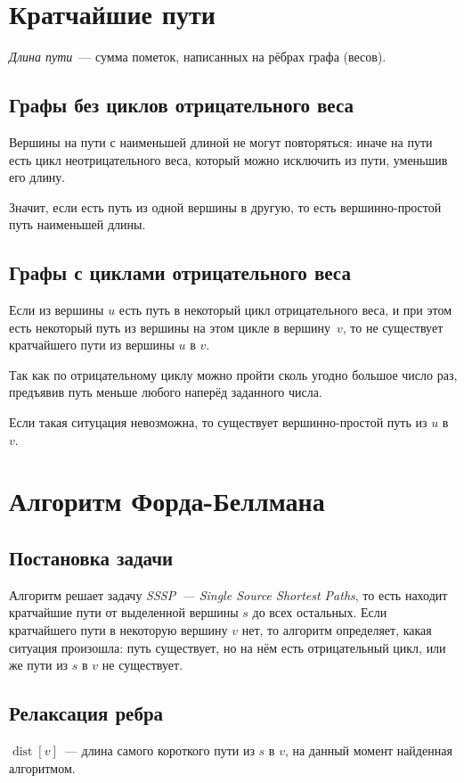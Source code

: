 \documentclass[a4paper,12pt]{article}
\DeclareMathOperator{\dist}{dist}
\begin{document}
  \section{Кратчайшие пути}

  \emph{Длина пути}~--- сумма пометок, написанных на рёбрах графа (весов).

    \subsection{Графы без циклов отрицательного веса}
    Вершины на пути с наименьшей длиной не могут повторяться:
    иначе на пути есть цикл неотрицательного веса, который можно исключить из пути,
    уменьшив его длину.

    Значит, если есть путь из одной вершины в другую, то есть вершинно-простой путь
    наименьшей длины.

    \subsection{Графы с циклами отрицательного веса}
    Если из вершины $u$ есть путь в некоторый цикл отрицательного веса,
    и при этом есть некоторый путь из вершины на этом цикле в вершину~$v$,
    то не существует кратчайшего пути из вершины $u$ в $v$.

    Так как по отрицательному циклу можно пройти сколь угодно большое число раз,
    предъявив путь меньше любого наперёд заданного числа.

    Если такая ситуцация невозможна, то существует вершинно-простой путь из $u$ в $v$.

  \section{Алгоритм Форда-Беллмана}

    \subsection{Постановка задачи}
    Алгоритм решает задачу \emph{SSSP~--- Single Source Shortest Paths},
    то есть находит кратчайшие пути от выделенной вершины $s$ до всех остальных.
    Если кратчайшего пути в некоторую вершину $v$ нет, то алгоритм определяет,
    какая ситуация произошла: путь существует, но на нём есть отрицательный цикл,
    или же пути из $s$ в $v$ не существует.

    \subsection{Релаксация ребра}
    $\dist[v]$~--- длина самого короткого пути из $s$ в $v$,
    на данный момент найденная алгоритмом.
\end{document}
